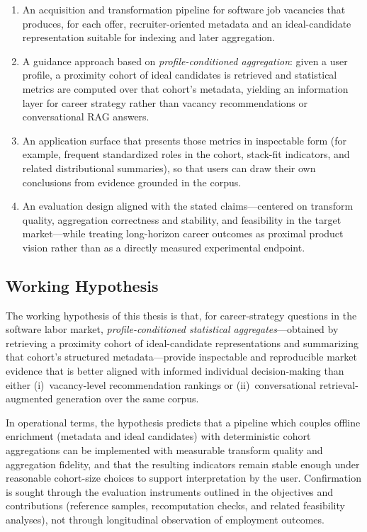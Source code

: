 \begin{enumerate}
  \item An acquisition and transformation pipeline for software job vacancies that produces, for each offer, recruiter-oriented metadata and an ideal-candidate representation suitable for indexing and later aggregation.
  \item A guidance approach based on \emph{profile-conditioned aggregation}: given a user profile, a proximity cohort of ideal candidates is retrieved and statistical metrics are computed over that cohort's metadata, yielding an information layer for career strategy rather than vacancy recommendations or conversational RAG answers.
  \item An application surface that presents those metrics in inspectable form (for example, frequent standardized roles in the cohort, stack-fit indicators, and related distributional summaries), so that users can draw their own conclusions from evidence grounded in the corpus.
  \item An evaluation design aligned with the stated claims---centered on transform quality, aggregation correctness and stability, and feasibility in the target market---while treating long-horizon career outcomes as proximal product vision rather than as a directly measured experimental endpoint.
\end{enumerate}

\subsection{Working Hypothesis}
\label{sec:working-hypothesis}

The working hypothesis of this thesis is that, for career-strategy questions in the software labor market, \emph{profile-conditioned statistical aggregates}---obtained by retrieving a proximity cohort of ideal-candidate representations and summarizing that cohort's structured metadata---provide inspectable and reproducible market evidence that is better aligned with informed individual decision-making than either (i)~vacancy-level recommendation rankings or (ii)~conversational retrieval-augmented generation over the same corpus.

In operational terms, the hypothesis predicts that a pipeline which couples offline enrichment (metadata and ideal candidates) with deterministic cohort aggregations can be implemented with measurable transform quality and aggregation fidelity, and that the resulting indicators remain stable enough under reasonable cohort-size choices to support interpretation by the user.
Confirmation is sought through the evaluation instruments outlined in the objectives and contributions (reference samples, recomputation checks, and related feasibility analyses), not through longitudinal observation of employment outcomes.

